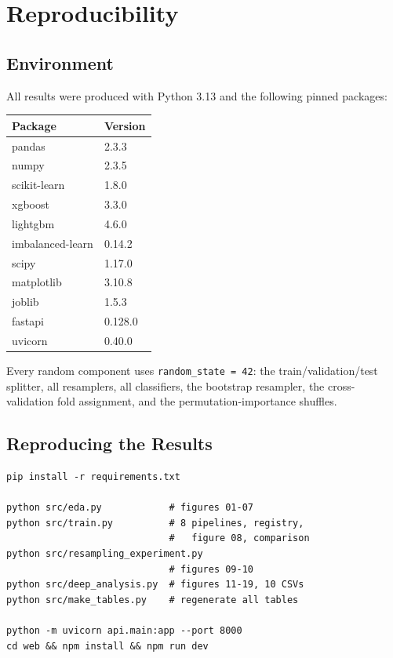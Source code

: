 \section{Reproducibility}
\label{app:repro}

\subsection{Environment}

All results were produced with Python 3.13 and the following pinned packages:

\begin{center}
\begin{tabular}{@{}ll@{}}
\hline
\textbf{Package} & \textbf{Version} \\
\hline
pandas             & 2.3.3 \\
numpy              & 2.3.5 \\
scikit-learn       & 1.8.0 \\
xgboost            & 3.3.0 \\
lightgbm           & 4.6.0 \\
imbalanced-learn   & 0.14.2 \\
scipy              & 1.17.0 \\
matplotlib         & 3.10.8 \\
joblib             & 1.5.3 \\
fastapi            & 0.128.0 \\
uvicorn            & 0.40.0 \\
\hline
\end{tabular}
\end{center}

Every random component uses \texttt{random\_\allowbreak state = 42}: the train/validation/test splitter,
all resamplers, all classifiers, the bootstrap resampler, the cross-validation fold
assignment, and the permutation-importance shuffles.

\subsection{Reproducing the Results}

{\footnotesize
\begin{verbatim}
pip install -r requirements.txt

python src/eda.py            # figures 01-07
python src/train.py          # 8 pipelines, registry,
                             #   figure 08, comparison
python src/resampling_experiment.py
                             # figures 09-10
python src/deep_analysis.py  # figures 11-19, 10 CSVs
python src/make_tables.py    # regenerate all tables

python -m uvicorn api.main:app --port 8000
cd web && npm install && npm run dev
\end{verbatim}
}

